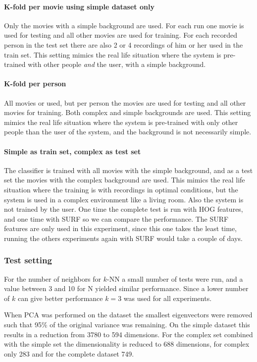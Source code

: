 \paragraph{K-fold per movie using simple dataset only}
Only the movies with a simple background are used. For each run one movie is used for testing and all other movies are used for training. For each recorded person in the test set there are also 2 or 4 recordings of him or her used in the train set. This setting mimics the real life situation where the system is pre-trained with other people \emph{and} the user, with a simple background.

\paragraph{K-fold per person}
All movies or used, but per person the movies are used for testing and all other movies for training. Both complex and simple backgrounds are used. This setting mimics the real life situation where the system is pre-trained with only other people than the user of the system, and the background is not necessarily simple. 

\paragraph{Simple as train set, complex as test set}
The classifier is trained with all movies with the simple background, and as a test set the movies with the complex background are used. This mimics the real life situation where the training is with recordings in optimal conditions, but the system is used in a complex environment like a living room. Also the system is not trained by the user. One time the complete test is run with HOG features, and one time with SURF so we can compare the performance. The SURF features are only used in this experiment, since this one takes the least time, running the others experiments again with SURF would take a couple of days.


\subsubsection{Test setting}
For the number of neighbors for $k$-NN a small number of tests were run, and a value between 3 and 10 for N yielded similar performance. Since a lower number of $k$ can give better performance $k=3$ was used for all experiments.

When PCA was performed on the dataset the smallest eigenvectors were removed such that 95\% of the original variance was remaining. On the simple dataset this results in a reduction from 3780 to 594 dimensions. For the complex set combined with the simple set the dimensionality is reduced to 688 dimensions, for complex only 283 and for the complete dataset 749.

